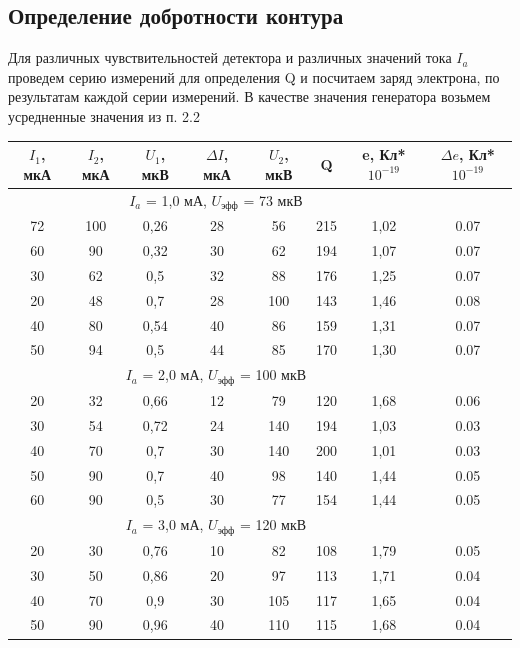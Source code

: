 \documentclass[12pt,a4paper]{article}
\begin{document}
\subsection{Определение добротности контура}

\par Для различных чувствительностей детектора и различных значений тока $I_a$ проведем серию измерений для определения Q и посчитаем заряд электрона, по результатам каждой серии измерений. В качестве значения генератора возьмем усредненные значения из п. 2.2

\begin{center}
\begin{tabular}{|c|c|c|c|c|c|c|c|}
\hline 
$I_1$, мкА & $I_2$, мкА & $U_1$, мкВ & $\Delta{I}$, мкА & $U_2$, мкВ & Q & e, Кл*$10^{-19}$ & $\Delta{e}$, Кл*$10^{-19}$\\ 
\hline 
\multicolumn{7}{|c|}{$I_a$ = 1,0 мА, $U_\text{эфф}$ = 73 мкВ} \\ 
\hline 
72 & 100 & 0,26 & 28 & 56 & 215 & 1,02 & 0.07 \\ 
\hline 
60 & 90 & 0,32 & 30 & 62 & 194 & 1,07 & 0.07 \\ 
\hline 
30 & 62 & 0,5 & 32 & 88 & 176 & 1,25 & 0.07 \\ 
\hline 
20 & 48 & 0,7 & 28 & 100 & 143 & 1,46 & 0.08 \\ 
\hline 
40 & 80 & 0,54 & 40 & 86 & 159 & 1,31 & 0.07 \\ 
\hline 
50 & 94 & 0,5 & 44 & 85 & 170 & 1,30 & 0.07 \\ 
\hline 
\multicolumn{7}{|c|}{$I_a$ = 2,0 мА, $U_\text{эфф}$ = 100 мкВ} \\ 
\hline 
20 & 32 & 0,66 & 12 & 79 & 120 & 1,68 & 0.06 \\ 
\hline 
30 & 54 & 0,72 & 24 & 140 & 194 & 1,03 & 0.03 \\ 
\hline 
40 & 70 & 0,7 & 30 & 140 & 200 & 1,01 & 0.03 \\ 
\hline 
50 & 90 & 0,7 & 40 & 98 & 140 & 1,44 & 0.05 \\ 
\hline 
60 & 90 & 0,5 & 30 & 77 & 154 & 1,44 & 0.05 \\ 
\hline 
\multicolumn{7}{|c|}{$I_a$ = 3,0 мА, $U_\text{эфф}$ = 120 мкВ} \\ 
\hline 
20 & 30 & 0,76 & 10 & 82 & 108 & 1,79 & 0.05 \\ 
\hline 
30 & 50 & 0,86 & 20 & 97 & 113 & 1,71 & 0.04 \\ 
\hline 
40 & 70 & 0,9 & 30 & 105 & 117 & 1,65 & 0.04 \\ 
\hline 
50 & 90 & 0,96 & 40 & 110 & 115 & 1,68 & 0.04 \\ 

\end{tabular}
\end{center}
\end{document}
